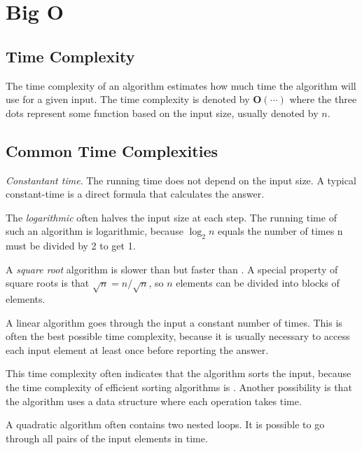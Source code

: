 \section{Big O}
\subsection*{Time Complexity}
The time complexity of an algorithm estimates how much time the algorithm will use for a given input. The time complexity is denoted by $\boldsymbol{O(\cdots)}$ where the three dots represent some function based on the input size, usually denoted by $n$.

\subsection*{Common Time Complexities}

\par {} \emph{Constantant time}. The running time does not depend on the input size. A typical constant-time is a direct formula that calculates the answer.

\par {} The \emph{logarithmic} often halves the input size at each step. The running time of such an algorithm is logarithmic, because $\log_2 n$ equals the number of times n must be divided by 2 to get 1.

\par {} A \emph{square root} algorithm is slower than  but faster than . A special property of square roots is that $\sqrt n = n/\sqrt n$, so $n$ elements can be divided into  blocks of  elements.

\par {} A linear algorithm goes through the input a constant number of times. This is often the best possible time complexity, because it is usually necessary to access each input element at least once before reporting the answer.

\par {} This time complexity often indicates that the algorithm sorts the input, because the time complexity of efficient sorting algorithms is . Another possibility is that the algorithm uses a data structure where each operation takes  time.

\par {} A quadratic algorithm often contains two nested loops. It is possible to go through all pairs of the input elements in  time.

